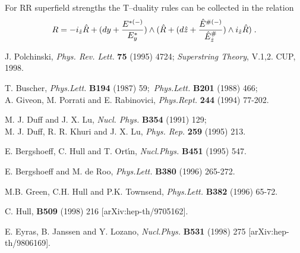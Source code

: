 \documentclass[a4paper,11pt]{article}
\begin{document}
For RR superfield strengths the T--duality rules can be collected in 
the relation    
\begin{eqnarray}
  \label{Td-RhR} 
R =  -  i_{\hat{z}} \hat{R}   +  (dy +  
{E^{ {*}(-)}\over E_y^{ {*}}})\wedge 
(\hat{R} + (d\hat{z} + 
{\hat{E}^{ {\#}(-)}\over \hat{E}_{\hat{z}}^{ {\#}}})
\wedge i_{\hat{z}} \hat{R} ) \; . 
\end{eqnarray}


\bigskip

\begin{thebibliography}{99}

J. Polchinski, {\em Phys. Rev. Lett.} {\bf 75} (1995) 4724; 
{\sl Superstring Theory}, V.1,2. CUP, 1998.   



T. Buscher, 
{\em Phys.Lett.} {\bf B194} (1987) 59;\,  
{\em Phys.Lett.} {\bf B201} (1988) 466; 
\\ A. Giveon, M. Porrati and E. Rabinovici,
 {\em Phys.Rept.} {\bf 244} (1994) 77-202. 

M. J. Duff and J. X. Lu, 
{\em
Nucl. Phys.} {\bf B354} (1991) 129; 
\\ M. J. Duff, R. R. Khuri and J. X. Lu, 
{\em Phys. Rep.} {\bf 259} (1995) 213.


E. Bergshoeff, C. Hull and T. Ort\'{\i}n, 
{\em Nucl.Phys.} {\bf B451} (1995) 547.



E. Bergshoeff and M. de Roo, 
{\em Phys.Lett.} {\bf B380} (1996) 265-272. 

M.B. Green, C.H. Hull and P.K. Townsend, 
{\em Phys.Lett.} {\bf B382} (1996) 65-72.

C. Hull, 
{\bf B509} (1998) 216 [arXiv:hep-th/9705162].


E. Eyras, B. Janssen and Y. Lozano, 
{\em Nucl.Phys.} {\bf B531} (1998) 275 
[arXiv:hep-th/9806169].


\end{thebibliography}
\end{document}
